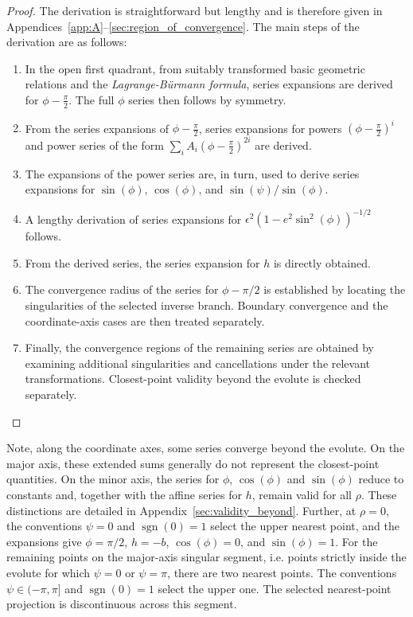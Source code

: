 \documentclass[a4paper]{amsart}
\DeclareMathOperator{\sgn}{sgn}
\begin{document}
\begin{proof}
The derivation is straightforward but lengthy and is therefore given in Appendices~\ref{app:A}--\ref{sec:region_of_convergence}.
The main steps of the derivation are as follows:
\begin{enumerate}
\item In the open first quadrant, from suitably transformed basic geometric relations and the \emph{Lagrange-B\"{u}rmann formula}, series expansions are derived for $\phi - \tfrac{\pi}{2}$. The full $\phi$ series then follows by symmetry. %
\item From the series expansions of $\phi - \tfrac{\pi}{2}$, series expansions for powers $(\phi - \tfrac{\pi}{2})^{i}$ and power series of the form $\sum_iA_i(\phi - \tfrac{\pi}{2})^{2i}$ are derived.
\item The expansions of the power series are, in turn, used to derive series expansions for $\sin(\phi)$, $\cos(\phi)$, and $\sin(\psi)/\sin(\phi)$.
\item A lengthy derivation of series expansions for $\epsilon^2(1-e^2\sin^2(\phi))^{-1/2}$ follows.
\item From the derived series, the series expansion for $h$ is directly obtained.
\item The convergence radius of the series for $\phi-\pi/2$ is established by locating the singularities of the selected inverse branch. Boundary convergence and the coordinate-axis cases are then treated separately.
\item Finally, the convergence regions of the remaining series are obtained by examining additional singularities and cancellations under the relevant transformations. Closest-point validity beyond the evolute is checked separately.
\end{enumerate}
\end{proof}
\noindent
Note, along the coordinate axes, some series converge beyond the evolute. On the major axis, these extended sums generally do not represent the closest-point quantities.
On the minor axis, the series for $\phi$, $\cos(\phi)$ and $\sin(\phi)$ reduce to constants and, together with the affine series for $h$, remain valid for all $\rho$. These distinctions are detailed in Appendix~\ref{sec:validity_beyond}.
%
Further, at $\rho=0$, the conventions $\psi=0$ and $\sgn(0)=1$ select the upper nearest point, and the expansions give $\phi=\pi/2$, $h=-b$, $\cos(\phi)=0$, and $\sin(\phi)=1$. For the remaining points on the major-axis singular segment, i.e. points strictly inside the evolute for which $\psi=0$ or $\psi=\pi$, there are two nearest points. The conventions $\psi\in(-\pi,\pi]$ and $\sgn(0)=1$ select the upper one. The selected nearest-point projection is discontinuous across this segment.
\end{document}
